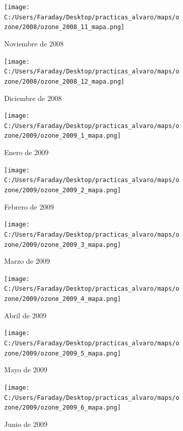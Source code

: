 \documentclass[12pt]{article}
\begin{document}
\begin{figure}[H]
\centering
\begin{subfigure}[h]{0.45\textwidth}
\texttt{[image: C:/Users/Faraday/Desktop/practicas\_alvaro/maps/ozone/2008/ozone\_2008\_11\_mapa.png]}
\caption{Noviembre de 2008}
\label{fig:map-mon-2-11-2008}
\end{subfigure}
%
\begin{subfigure}[H]{0.45\textwidth}
\texttt{[image: C:/Users/Faraday/Desktop/practicas\_alvaro/maps/ozone/2008/ozone\_2008\_12\_mapa.png]}
\caption{Diciembre de 2008}
\label{fig:map-mon-2-12-2008}
\end{subfigure}
\caption{}
\end{figure}

\newpage

\begin{figure}[H]
\centering
\begin{subfigure}[h]{0.45\textwidth}
\texttt{[image: C:/Users/Faraday/Desktop/practicas\_alvaro/maps/ozone/2009/ozone\_2009\_1\_mapa.png]}
\caption{Enero de 2009}
\label{fig:map-mon-2-1-2009}
\end{subfigure}
%
\begin{subfigure}[H]{0.45\textwidth}
\texttt{[image: C:/Users/Faraday/Desktop/practicas\_alvaro/maps/ozone/2009/ozone\_2009\_2\_mapa.png]}
\caption{Febrero de 2009}
\label{fig:map-mon-2-2-2009}
\end{subfigure}
\caption{}
\end{figure}

\begin{figure}[H]
\centering
\begin{subfigure}[h]{0.45\textwidth}
\texttt{[image: C:/Users/Faraday/Desktop/practicas\_alvaro/maps/ozone/2009/ozone\_2009\_3\_mapa.png]}
\caption{Marzo de 2009}
\label{fig:map-mon-2-3-2009}
\end{subfigure}
%
\begin{subfigure}[H]{0.45\textwidth}
\texttt{[image: C:/Users/Faraday/Desktop/practicas\_alvaro/maps/ozone/2009/ozone\_2009\_4\_mapa.png]}
\caption{Abril de 2009}
\label{fig:map-mon-2-4-2009}
\end{subfigure}
\caption{}
\end{figure}

\begin{figure}[H]
\centering
\begin{subfigure}[h]{0.45\textwidth}
\texttt{[image: C:/Users/Faraday/Desktop/practicas\_alvaro/maps/ozone/2009/ozone\_2009\_5\_mapa.png]}
\caption{Mayo de 2009}
\label{fig:map-mon-2-5-2009}
\end{subfigure}
%
\begin{subfigure}[H]{0.45\textwidth}
\texttt{[image: C:/Users/Faraday/Desktop/practicas\_alvaro/maps/ozone/2009/ozone\_2009\_6\_mapa.png]}
\caption{Junio de 2009}
\label{fig:map-mon-2-6-2009}
\end{subfigure}
\caption{}
\end{figure}
\end{document}
